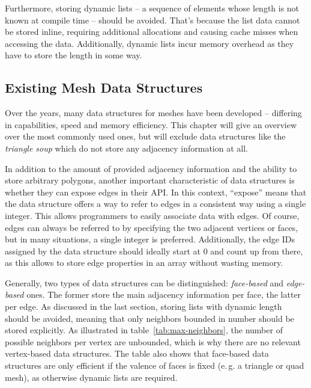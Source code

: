 Furthermore, storing dynamic lists -- a sequence of elements whose length is not known at compile time -- should be avoided.
That's because the list data cannot be stored inline, requiring additional allocations and causing cache misses when accessing the data.
Additionally, dynamic lists incur memory overhead as they have to store the length in some way.

\newpage
\subsection{Existing Mesh Data Structures}

Over the years, many data structures for meshes have been developed -- differing in capabilities, speed and memory efficiency.
This chapter will give an overview over the most commonly used ones, but will exclude data structures like the \emph{triangle soup} which do not store any adjacency information at all.

In addition to the amount of provided adjacency information and the ability to store arbitrary polygons, another important characteristic of data structures is whether they can expose edges in their API.
In this context, \enquote{expose} means that the data structure offers a way to refer to edges in a consistent way using a single integer.
This allows programmers to easily associate data with edges.
Of course, edges can always be referred to by specifying the two adjacent vertices or faces, but in many situations, a single integer is preferred.
Additionally, the edge IDs assigned by the data structure should ideally start at 0 and count up from there, as this allows to store edge properties in an array without wasting memory.

Generally, two types of data structures can be distinguished: \emph{face-based} and \emph{edge-based} ones.
The former store the main adjacency information per face, the latter per edge.
As discussed in the last section, storing lists with dynamic length should be avoided, meaning that only neighbors bounded in number should be stored explicitly.
As illustrated in table~\ref{tab:max-neighbors}, the number of possible neighbors per vertex are unbounded, which is why there are no relevant vertex-based data structures.
The table also shows that face-based data structures are only efficient if the valence of faces is fixed (e.\,g. a triangle or quad mesh), as otherwise dynamic lists are required.

